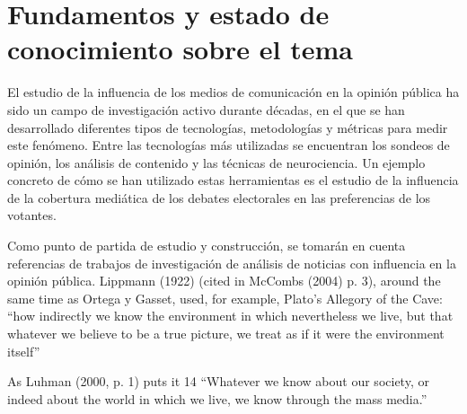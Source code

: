 \documentclass[12pt]{article}
\begin{document}
\section{Fundamentos y estado de conocimiento sobre el tema}

%


El estudio de la influencia de los medios de comunicación en la opinión pública ha sido un campo de investigación activo durante décadas, en el que se han desarrollado diferentes tipos de tecnologías, metodologías y métricas para medir este fenómeno. Entre las tecnologías más utilizadas se encuentran los sondeos de opinión, los análisis de contenido y las técnicas de neurociencia. Un ejemplo concreto de cómo se han utilizado estas herramientas es el estudio de la influencia de la cobertura mediática de los debates electorales en las preferencias de los votantes. 




Como punto de partida de estudio y construcción, se tomarán en cuenta referencias de trabajos de investigación de análisis de noticias con influencia en la opinión pública. Lippmann (1922) (cited in McCombs (2004) p. 3), around the same time as Ortega y Gasset, used, for example, Plato’s Allegory of the Cave: “how indirectly we know the environment in which nevertheless we live, but that whatever we believe to be a true picture, we treat as if it were the environment itself”

As Luhman (2000, p. 1) puts it 14 “Whatever we know about our society, or indeed
about the world in which we live, we know through the mass media.”
\end{document}
